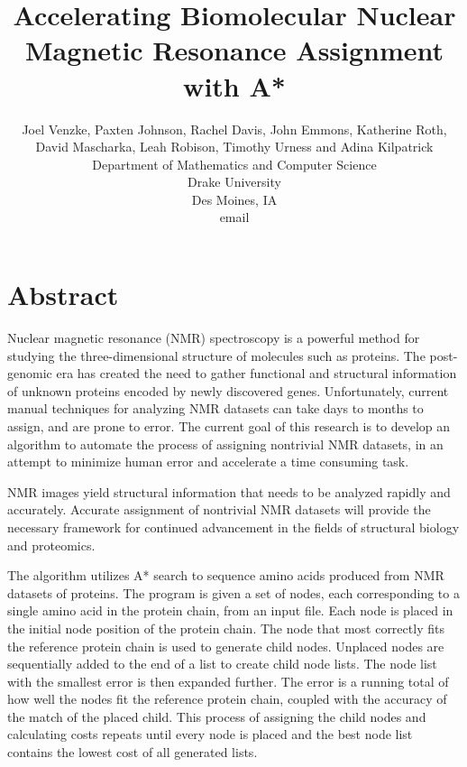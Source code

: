 \documentclass[12pt]{article}
\begin{document}
\pagestyle{plain}

\title{Accelerating Biomolecular Nuclear Magnetic Resonance Assignment with A*}

\author{
Joel Venzke, Paxten Johnson, Rachel Davis, John Emmons, Katherine Roth,\\ David Mascharka, Leah Robison, Timothy Urness and Adina Kilpatrick\\
Department of Mathematics and Computer Science\\
Drake University\\
Des Moines, IA\\
email %
}
\date{} 

\maketitle
\thispagestyle{empty}

\section*{\centering Abstract}

Nuclear magnetic resonance (NMR) spectroscopy is a powerful method for studying the three-dimensional structure of molecules such as proteins. The post-genomic era has created the need to gather functional and structural information of unknown proteins encoded by newly discovered genes. Unfortunately, current manual techniques for analyzing NMR datasets can take days to months to assign, and are prone to error. The current goal of this research is to develop an algorithm to automate the process of assigning nontrivial NMR datasets, in an attempt to minimize human error and accelerate a time consuming task.

NMR images yield structural information that needs to be analyzed rapidly and accurately. Accurate assignment of nontrivial NMR datasets will provide the necessary framework for continued advancement in the fields of structural biology and proteomics. 

The algorithm utilizes A* search to sequence amino acids produced from NMR datasets of proteins. The program is given a set of nodes, each corresponding to a single amino acid in the protein chain, from an input file. Each node is placed in the initial node position of the protein chain. The node that most correctly fits the reference protein chain is used to generate child nodes. Unplaced nodes are sequentially added to the end of a list to create child node lists. The node list with the smallest error is then expanded further. The error is a running total of how well the nodes fit the reference protein chain, coupled with the accuracy of the match of the placed child. This process of assigning the child nodes and calculating costs repeats until every node is placed and the best node list contains the lowest cost of all generated lists. 
\end{document}
